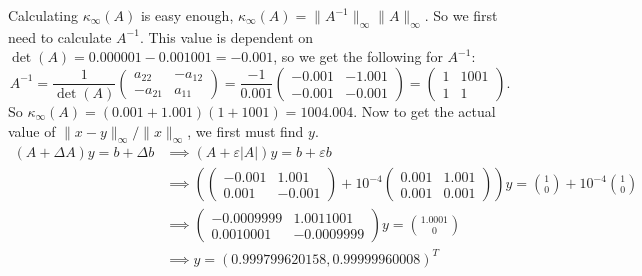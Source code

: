 \documentclass[11pt]{article}
\begin{document}
\begin{enumerate}
	      Calculating \(\kappa_\infty(A)\) is easy enough, \(\kappa_\infty(A) = \lVert A^{-1} \rVert_\infty \lVert A \rVert_\infty\).  So we first need to calculate \(A^{-1}\). This value is dependent on \(\det(A) = 0.000001 - 0.001001 = -0.001\), so we get the following for \(A^{-1}\):
	      \[
		      A^{-1} = \frac{1}{\det(A)} \left(\begin{array}{cc} a_{22} & -a_{12} \\ -a_{21} & a_{11} \end{array}\right)
		      = \frac{-1}{0.001} \left( \begin{array}{cc} -0.001 & -1.001 \\ -0.001 & -0.001 \end{array} \right)
		      = \left( \begin{array}{cc} 1 & 1001 \\ 1 & 1 \end{array} \right).
	      \]
	      So \(\kappa_\infty(A) = (0.001 + 1.001)(1 + 1001) = 1004.004\).  Now to get the actual value of \(\lVert x-y \rVert_\infty / \lVert x \rVert_\infty\), we first must find \(y\).
	      \begin{align*}
		      (A + \Delta A)y = b + \Delta b & \implies (A + \varepsilon |A|)y = b + \varepsilon b                                                   \\
		                                     & \implies \left(\left(\begin{array}{rr} -0.001 & 1.001 \\ 0.001 & -0.001 \end{array}\right)
		      + 10^{-4} \left(\begin{array}{rr} 0.001 & 1.001 \\ 0.001 & 0.001 \end{array}\right)\right)y
		      = \binom10 + 10^{-4} \binom10                                                                                                          \\
		                                     & \implies \left(\begin{array}{rr} -0.0009999 & 1.0011001 \\ 0.0010001 & -0.0009999 \end{array}\right)y
		      = \binom{1.0001}0                                                                                                                      \\
		                                     & \implies y = (0.999799620158, 0.99999960008)^T
	      \end{align*}


\end{enumerate}
\end{document}
